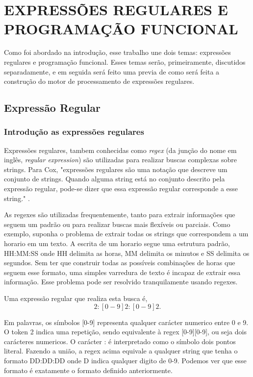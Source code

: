 \section{EXPRESSÕES REGULARES E PROGRAMAÇÃO FUNCIONAL}
Como foi abordado na introdução, esse trabalho une dois temas: expressões regulares e programação funcional.
Esses temas serão, primeiramente, discutidos separadamente, e em seguida será feito uma previa de como será feita a construção do motor de processamento de expressões regulares.
\subsection{Expressão Regular}

\subsubsection{Introdução as expressões regulares}

Expressões regulares, tambem conhecidas como \emph{regex} (da junção do nome em inglês, \emph{regular expression}) são utilizadas para realizar buscas complexas sobre strings.
Para Cox,
"expressões regulares são uma notação que descreve um conjunto de strings.
Quando alguma string está no conjunto descrito pela expressão regular, pode-se dizer que essa expressão regular corresponde a esse string." \cite{cox}.

As regexes são utilizadas frequentemente, tanto para extrair informações que seguem um padrão ou para realizar buscas mais flexíveis ou parciais.
Como exemplo, suponha o problema de extrair todas os strings que correspondem a um horario em um texto.
A escrita de um horario segue uma estrutura padrão, HH:MM:SS onde HH delimita as horas, MM delimita os minutos e SS delimita os segundos.
Sem ter que construir todas as possíveis combinações de horas que seguem esse formato, uma simples varredura de texto é incapaz de extrair essa informação.
Esse problema pode ser resolvido tranquilamente usando regexes.

Uma expressão regular que realiza esta busca é,
\begin{equation}
  [0-9]{2}:[0-9]{2}:[0-9]{2} .
\end{equation}

Em palavras, os símbolos [0-9] representa qualquer carácter numerico entre 0 e 9.
O token {2} indica uma repetição, sendo equivalente à regex [0-9][0-9], ou seja dois carácteres numericos.
O carácter : é interpretado como o símbolo dois pontos literal.
Fazendo a união, a regex acima equivale a qualquer string que tenha o formato DD:DD:DD onde D indica qualquer digito de 0-9.
Podemos ver que esse formato é exatamente o formato definido anteriormente.

